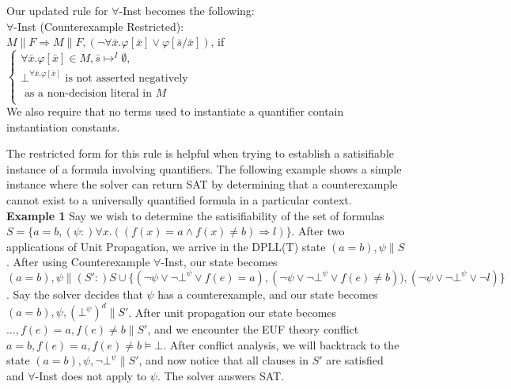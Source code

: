 \documentclass{llncs}
\begin{document}
Our updated rule for $\forall$-Inst becomes the following: \\

\noindent $\forall$-Inst (Counterexample Restricted): \\

$M \parallel F \Longrightarrow M \parallel F, (\neg \forall \bar{x}. \varphi[ \bar{ x } ] \vee \varphi[ \bar{ s }/\bar{x} ])$, if   
$\begin{cases}
  \forall \bar{x}. \varphi[ \bar{ x } ] \in M, \bar{ s } \mapsto^I \emptyset, \\
  \bot^{\forall \bar{x}. \varphi[ \bar{ x } ]} \text{ is not asserted negatively }\\
  \text{ \ \ \ as a non-decision literal in $M$ } \\    
\end{cases}$ \\

We also require that no terms used to instantiate a quantifier contain instantiation constants.

The restricted form for this rule is helpful when trying to establish a satisifiable instance of a formula involving quantifiers.
The following example shows a simple instance where the solver can return SAT by determining that a counterexample cannot exist to a universally quantified formula in a particular context. \\

{\bf Example 1}
Say we wish to determine the satisifiability of the set of formulas $S = \{ a = b, (\psi :) \forall x. ((f(x) = a \wedge f(x) \neq b) \Rightarrow l) \}$.
After two applications of Unit Propagation, we arrive in the DPLL(T) state $( a = b ), \psi \parallel S$.
After using Counterexample $\forall$-Inst, our state becomes $( a = b ), \psi \parallel (S':) S \cup \{ (\neg \psi \vee \neg \bot^\psi \vee f( e ) = a), (\neg \psi \vee \neg \bot^\psi \vee f( e ) \neq b)), (\neg \psi \vee \neg \bot^\psi \vee \neg l) \}$.
Say the solver decides that $\psi$ has a counterexample, and our state becomes $( a = b ), \psi, (\bot^\psi)^d \parallel S'$. 
After unit propagation our state becomes $\ldots, f( e ) = a, f( e ) \neq b \parallel S'$, and we encounter the EUF theory conflict $a = b, f( e ) = a, f( e ) \neq b \models \bot$.
After conflict analysis, we will backtrack to the state $( a = b ), \psi, \neg \bot^\psi \parallel S'$, and now notice that all clauses in $S'$ are satisfied and $\forall$-Inst does not apply to $\psi$.
The solver answers SAT. \\
\end{document}
